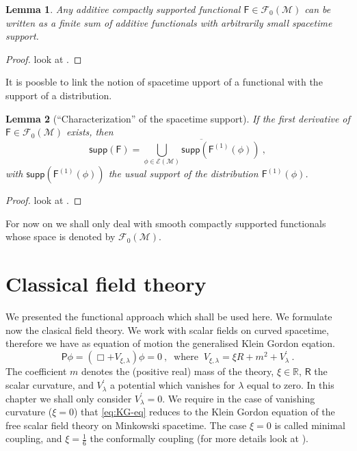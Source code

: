 \documentclass[10pt]{book}
\newcommand{\supp}{\mathsf{supp}}
\newcommand{\Ecal}{\mathcal{E}}
\newcommand{\Fcal}{\mathcal{F}}
\newcommand{\Mcal}{\mathcal{M}}
\newcommand{\Rbb}{\mathbb{R}}
\newcommand{\Fsf}{\mathsf{F}}
\newcommand{\Psf}{\mathsf{P}}
\newcommand{\Rsf}{\mathsf{R}}
\theoremstyle{break}
\newtheorem{lemma}{Lemma}
\begin{document}
\begin{lemma}
Any additive compactly supported  functional $\Fsf \in \Fcal_0(\Mcal)$ can be written as a finite sum of additive functionals with arbitrarily small spacetime support.
\end{lemma}


\begin{proof}
look at \cite[lemma 2.3.5]{brunetti_algebraic_2012}. 
\end{proof}


It is poosble to link the notion of spacetime upport of a functional with the support of a distribution.


\begin{lemma}[``Characterization'' of the spacetime support]
If the first derivative of $\Fsf\in\Fcal_0(\Mcal)$ exists, then
%
\begin{equation*}
\supp\left(\Fsf\right) = \overline{\bigcup_{\phi\in\Ecal(\Mcal)} \supp\left(\Fsf^{(1)}(\phi)\right)} \ ,
\end{equation*}
%
with $\supp\left(\Fsf^{(1)}(\phi)\right)$ the usual support of the distribution $\Fsf^{(1)}(\phi)$.
\end{lemma}


\begin{proof}
look at \cite[lemma 2.3.5]{brunetti_algebraic_2012}. 
\end{proof}


For now on we shall only deal with smooth compactly supported functionals whose space is denoted by $\Fcal_0(\Mcal)$.


\section{Classical field theory}


We presented the functional approach which shall be used here. We formulate now the clasical field theory. We work with scalar fields on curved spacetime, therefore we have as equation of motion the generalised Klein Gordon eqation.%
%
\begin{equation} 
\Psf \phi = \left( \Box + V_{\xi,\lambda} \right) \phi = 0 \ , \
\mbox{ where } \ V_{\xi,\lambda} = \xi R + m^2 + V^\prime_\lambda \ . 
\label{eq:KG-eq}
\end{equation}
%
The coefficient $m$ denotes the (positive real) mass of the theory, $\xi \in \Rbb$, $\Rsf$ the scalar curvature, and $V^\prime_\lambda$ a potential which vanishes for $\lambda$ equal to zero. In this chapter we shall only consider $V^\prime_\lambda=0$. We require in the case of vanishing curvature ($\xi=0$) that \eqref{eq:KG-eq}
reduces to the Klein Gordon equation of the free scalar field theory on Minkowski spacetime. The case $\xi=0$ is called minimal coupling, and $\xi=\frac16$ the conformally coupling (for more details look at \cite{waldGR}).
\end{document}
